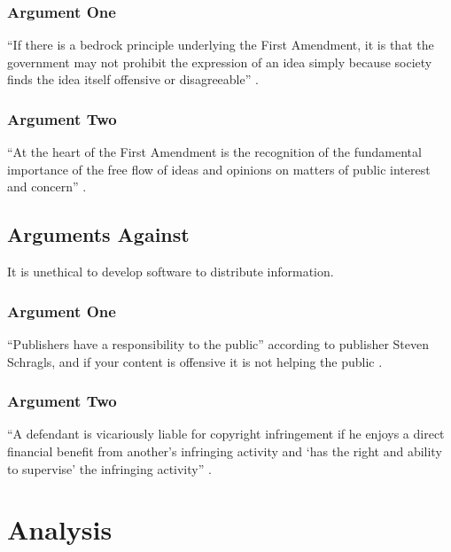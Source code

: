 \documentclass[11pt]{article}
\begin{document}
\subsubsection{Argument One}
``If there is a bedrock principle underlying the First Amendment, it is that the government may not prohibit the expression of an idea simply because society finds the idea itself offensive or disagreeable'' \cite[414]{1989texas}.

\subsubsection{Argument Two}
``At the heart of the First Amendment is the recognition of the fundamental importance of the free flow of ideas and opinions on matters of public interest and concern'' \cite[51]{1988hustler}.

\subsection{Arguments Against}
It is unethical to develop software to distribute information.

\subsubsection{Argument One}

``Publishers have a responsibility to the public'' according to publisher Steven Schragls, and if your content is offensive it is not helping the public \cite[46]{hawker}.

\subsubsection{Argument Two}

``A defendant is vicariously liable for copyright infringement if he enjoys a direct financial benefit from another's infringing activity and `has the right and ability to supervise' the infringing activity'' \cite{2000m}.

\section{Analysis}
\end{document}
